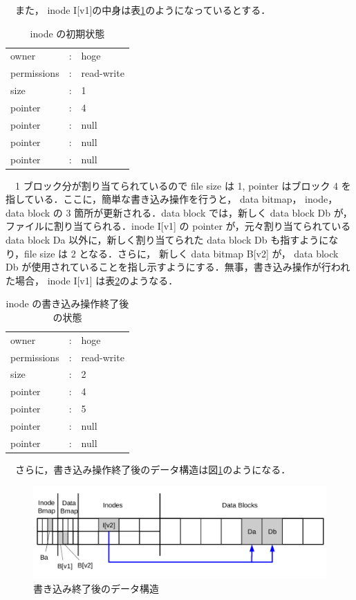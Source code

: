 \documentclass[graduation-thesis]{jsarticle}
\begin{document}
　また， inode I[v1]の中身は表\ref{tab:inode1}のようになっているとする．\\
\begin{table}[h]
	\begin{center}
	\caption{inode の初期状態}
		\begin{tabular}{lcl}
			owner & : & hoge \\
			permissions & : & read-write \\
			size & : & 1 \\
			pointer & : & 4 \\
			pointer & : & null \\
			pointer & : & null \\
			pointer & : & null
		\end{tabular}
		\label{tab:inode1}
	\end{center}
\end{table}
　1 ブロック分が割り当てられているので file size は 1, pointer はブロック 4 を指している．ここに，簡単な書き込み操作を行うと， data bitmap， inode， data block の 3 箇所が更新される．data block では，新しく data block Db が，ファイルに割り当てられる．inode I[v1] の pointer が，元々割り当てられている data block Da 以外に，新しく割り当てられた data block Db も指すようになり，file size は 2 となる．さらに， 新しく data bitmap B[v2] が， data block Db が使用されていることを指し示すようにする．無事，書き込み操作が行われた場合， inode I[v1] は表\ref{tab:inode2}のようなる．\\
\begin{table}[h]
	\begin{center}
	\caption{inode の書き込み操作終了後の状態}
		\begin{tabular}{lcl}
			owner & : & hoge \\
			permissions & : & read-write \\
			size & : & 2 \\
			pointer & : & 4 \\
			pointer & : & 5 \\
			pointer & : & null \\
			pointer & : & null
		\end{tabular}
		\label{tab:inode2}
	\end{center}
\end{table}
　さらに，書き込み操作終了後のデータ構造は図\ref{fig:data2}のようになる．\\
\begin{figure}[H]
	\begin{center}
		\includegraphics[width=15.0cm,clip]{images/data2.pdf}
		\caption{書き込み終了後のデータ構造}
		\label{fig:data2}
	\end{center}
\end{figure}
\end{document}
